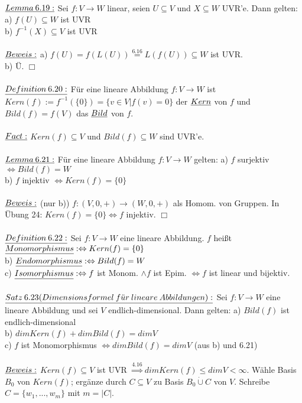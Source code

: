 \documentclass[fleqn, a4paper, 11pt]{article}
\begin{document}
\\
$\uline{Lemma\:6.19:}$ Sei $f:V\rightarrow W$ linear, seien $U\subseteq V$ und $X\subseteq W$ UVR'e. Dann gelten: a) $f(U)\subseteq W$ ist UVR\\
b) $f^{-1}(X)\subseteq V$ ist UVR\\
\\
$\uline{Beweis:}$ a) $f(U)=f(L(U))\stackrel{6.16}{=}L(f(U))\subseteq W$ ist UVR.\\
b) \"U. \hfill $\Box$\\
\\
$\uline{Definition\:6.20:}$ F\"ur eine lineare Abbildung $f:V\rightarrow W$ ist $Kern(f):=f^{-1}(\{0\})=\{v\in V|f(v)=0\}$ der $\uline{Kern}$ von $f$ und $Bild(f)=f(V)$ das $\uline{Bild}$ von $f$.\\
\\
$\uline{Fact:}$ $Kern(f)\subseteq V$ und $Bild(f)\subseteq W$ sind UVR'e.\\
\\
$\uline{Lemma\:6.21:}$ F\"ur eine lineare Abbildung $f:V\rightarrow W$ gelten: a) $f$ surjektiv $\Leftrightarrow Bild(f)=W$\\
b) $f$ injektiv $\Leftrightarrow Kern(f)=\{0\}$\\
\\
$\uline{Beweis:}$ (nur b)) $f:(V,0,+)\rightarrow (W,0,+)$ als Homom. von Gruppen. In \"Ubung 24: $Kern(f)=\{0\}\Leftrightarrow f$ injektiv. \hfill $\Box$\\
\\
$\uline{Definition\:6.22:}$ Sei $f:V\rightarrow W$ eine lineare Abbildung. $f$ hei\ss{}t $\uline{Monomorphismus}:\Leftrightarrow Kern(f)=\{0\}$\\
b) $\uline{Endomorphismus}:\Leftrightarrow Bild(f)=W$\\
c) $\uline{Isomorphismus}:\Leftrightarrow f$ ist Monom. $\wedge f$ ist Epim. $\Leftrightarrow f$ ist linear und bijektiv.\\
\\
$\uline{Satz\:6.23(Dimensionsformel\:f\ddot{u}r\:lineare\:Abbildungen):}$ Sei $f:V\rightarrow W$ eine lineare Abbildung und sei $V$ endlich-dimensional. Dann gelten: a) $Bild(f)$ ist endlich-dimensional\\
b) $dim Kern(f)+dim Bild(f)=dim V$\\
c) $f$ ist Monomorphismus $\Leftrightarrow dim Bild(f)=dim V$ (aus b) und 6.21)\\
\\
$\uline{Beweis:}$ $Kern(f)\subseteq V$ ist UVR $\stackrel{4.16}{\Rightarrow} dim Kern(f)\leq dim V<\infty$. W\"ahle Basis $B_0$ von $Kern(f)$; erg\"anze durch $C\subseteq V$ zu Basis $B_0\mathbin{\dot{\cup}} C$ von $V$. Schreibe $C=\{w_1,...,w_m\}$ mit $m=|C|$.\\
\end{document}
